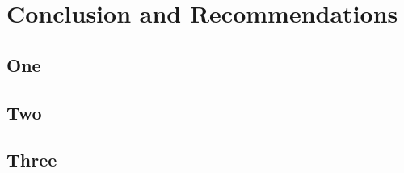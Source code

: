 
\chapter{Conclusion and Recommendations}

\section{One}

\section{Two}

\section{Three}


\newpage
